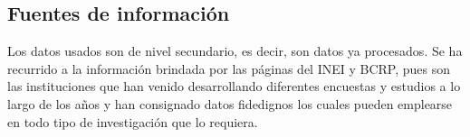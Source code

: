 \subsection{Fuentes de información}

Los datos usados son de nivel secundario, es decir, son datos ya procesados. Se ha recurrido a la información brindada por las páginas del INEI y BCRP, pues son las instituciones que han venido desarrollando diferentes encuestas y estudios a lo largo de los años y han consignado datos fidedignos los cuales pueden emplearse en todo tipo de investigación que lo requiera.

